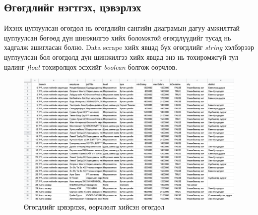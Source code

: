 \subsection{Өгөгдлийг нэгтгэх, цэвэрлэх}
Ихэнх цуглуулсан өгөгдөл нь өгөгдлийн сангийн диаграмын дагуу амжилттай цуглуулсан бөгөөд дүн шинжилгээ хийх боломжтой өгөгдлүүдийг тусад нь хадгалж ашигласан болно. Data scrape хийх явцад бүх өгөгдлийг \textit{string} хэлбэрээр цуглуулсан бол өгөгдөлд дүн шинжилгээ хийх явцад энэ нь тохиромжгүй тул цалинг \textit{float} тохиролцох эсэхийг \textit{boolean} болгож өөрчлөв. 

\begin{figure}[ht]
  \centering
  \includegraphics[width=\textwidth]{images/dataSetClean.png}
  \caption{Өгөгдлийг цэвэрлэж, өөрчлөлт хийсэн өгөгдөл}\label{fig:dataSetClean}
\end{figure}
